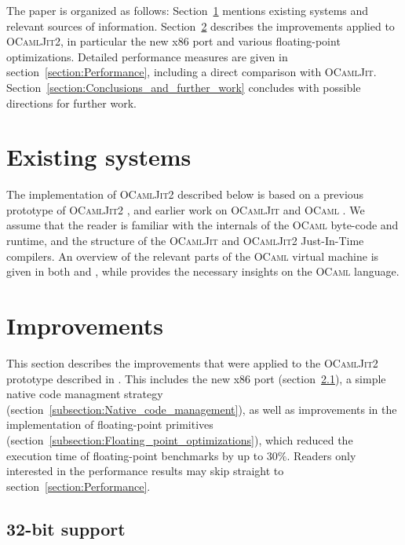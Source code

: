 \documentclass[12pt,a4paper,final]{article}
\begin{document}
The paper is organized as follows: Section~\ref{section:Existing_systems} mentions existing
systems and relevant sources of information. Section~\ref{section:Improvements} describes
the improvements applied to \textsc{OCamlJit2}, in particular the new x86 port and various
floating-point optimizations. Detailed performance measures are given in
section~\ref{section:Performance}, including a direct comparison with
\textsc{OCamlJit}. Section~\ref{section:Conclusions_and_further_work} concludes with
possible directions for further work.


\section{Existing systems} \label{section:Existing_systems}

The implementation of \textsc{OCamlJit2} described below is based on a previous
prototype of \textsc{OCamlJit2} \cite{Meurer10:OCamlJit2.0}, and earlier work on
\textsc{OCamlJit} \cite{Starynkevitch04} and \textsc{OCaml} \cite{Leroy90,Leroy10,Leroy02,Remy02}.
We assume that the reader is familiar with the internals of the \textsc{OCaml} byte-code
and runtime, and the structure of the \textsc{OCamlJit} and \textsc{OCamlJit2} Just-In-Time
compilers. An overview of the relevant parts of the \textsc{OCaml} virtual machine is given
in both \cite{Meurer10:OCamlJit2.0} and \cite{Starynkevitch04}, while \cite{Remy02} provides
the necessary insights on the \textsc{OCaml} language.


\section{Improvements} \label{section:Improvements}

This section describes the improvements that were applied to the \textsc{OCamlJit2} prototype
described in \cite{Meurer10:OCamlJit2.0}. This
includes the new x86 port (section~\ref{subsection:32_bit_support}), a simple native code managment
strategy (section~\ref{subsection:Native_code_management}), as well as improvements
in the implementation of floating-point primitives (section~\ref{subsection:Floating_point_optimizations}),
which reduced the execution time of floating-point benchmarks by up to $30\%$.
Readers only interested in the performance results may skip straight to section~\ref{section:Performance}.

\subsection{32-bit support} \label{subsection:32_bit_support}
\end{document}
